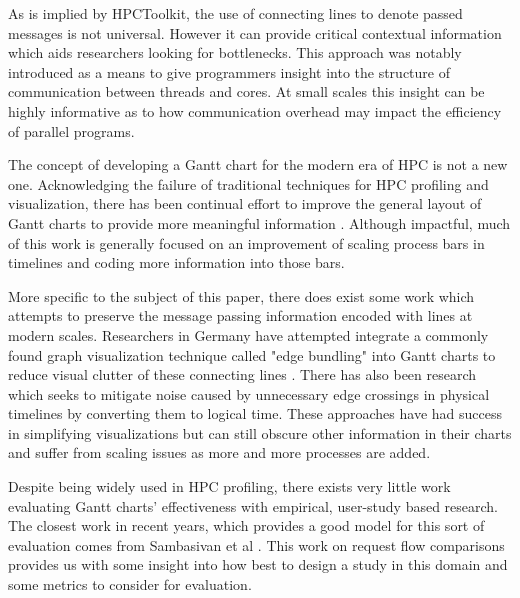 As is implied by HPCToolkit, the use of connecting lines to denote passed messages is not universal. However it can provide critical contextual information which aids researchers looking for bottlenecks. This approach was notably introduced as a means to give programmers insight into the structure of communication between threads and cores\cite{Leblanc1990}. At small scales this insight can be highly informative as to how communication overhead may impact the efficiency of parallel programs. 

The concept of developing a Gantt chart for the modern era of HPC is not a new one. Acknowledging the failure of traditional techniques for HPC profiling and visualization, there has been continual effort to improve the general layout of Gantt charts to provide more meaningful information \cite{Cottam2015, Adhianto2016HPCToolkit, Tallent2011}. Although impactful, much of this work is generally focused on an improvement of scaling process bars in timelines and coding more information into those bars. 

More specific to the subject of this paper, there does exist some work which attempts to preserve the message passing information encoded with lines at modern scales. Researchers in Germany have attempted integrate a commonly found graph visualization technique called "edge bundling" into Gantt charts to reduce visual clutter of these connecting lines \cite{Brendel2016}. There has also been research which seeks to mitigate noise caused by unnecessary edge crossings in physical timelines by converting them to logical time\cite{isaacs2014combing}. These approaches have had success in simplifying visualizations but can still obscure other information in their charts and suffer from scaling issues as more and more processes are added. 

Despite being widely used in HPC profiling, there exists very little work evaluating Gantt charts' effectiveness with empirical, user-study based research. The closest work in recent years, which provides a good model for this sort of evaluation comes from Sambasivan et al \cite{Sambasivan2013}. This work on request flow comparisons provides us with some insight into how best to design a study in this domain and some metrics to consider for evaluation.

